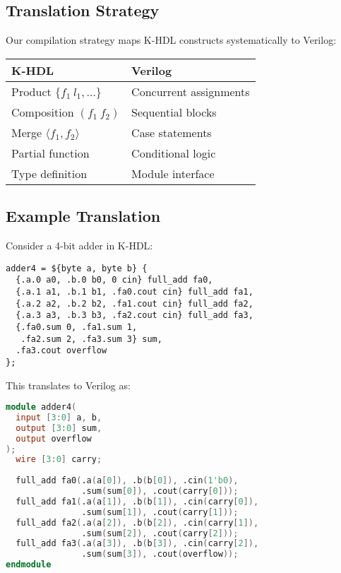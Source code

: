 \documentclass[10pt,twocolumn]{article}
\begin{document}
\subsection{Translation Strategy}

Our compilation strategy maps K-HDL constructs systematically to Verilog:

\begin{center}
\begin{tabular}{l|l}
\textbf{K-HDL} & \textbf{Verilog} \\
\hline
Product $\{f_1\ l_1, \ldots\}$ & Concurrent assignments \\
Composition $(f_1\ f_2)$ & Sequential blocks \\
Merge $\langle f_1, f_2 \rangle$ & Case statements \\
Partial function & Conditional logic \\
Type definition & Module interface \\
\end{tabular}
\end{center}

\subsection{Example Translation}

Consider a 4-bit adder in K-HDL:

\begin{lstlisting}
adder4 = ${byte a, byte b} {
  {.a.0 a0, .b.0 b0, 0 cin} full_add fa0,
  {.a.1 a1, .b.1 b1, .fa0.cout cin} full_add fa1,
  {.a.2 a2, .b.2 b2, .fa1.cout cin} full_add fa2,
  {.a.3 a3, .b.3 b3, .fa2.cout cin} full_add fa3,
  {.fa0.sum 0, .fa1.sum 1, 
   .fa2.sum 2, .fa3.sum 3} sum,
  .fa3.cout overflow
};
\end{lstlisting}

This translates to Verilog as:

\begin{lstlisting}[language=Verilog]
module adder4(
  input [3:0] a, b,
  output [3:0] sum,
  output overflow
);
  wire [3:0] carry;
  
  full_add fa0(.a(a[0]), .b(b[0]), .cin(1'b0),
               .sum(sum[0]), .cout(carry[0]));
  full_add fa1(.a(a[1]), .b(b[1]), .cin(carry[0]),
               .sum(sum[1]), .cout(carry[1]));
  full_add fa2(.a(a[2]), .b(b[2]), .cin(carry[1]),
               .sum(sum[2]), .cout(carry[2]));
  full_add fa3(.a(a[3]), .b(b[3]), .cin(carry[2]),
               .sum(sum[3]), .cout(overflow));
endmodule
\end{lstlisting}
\end{document}
